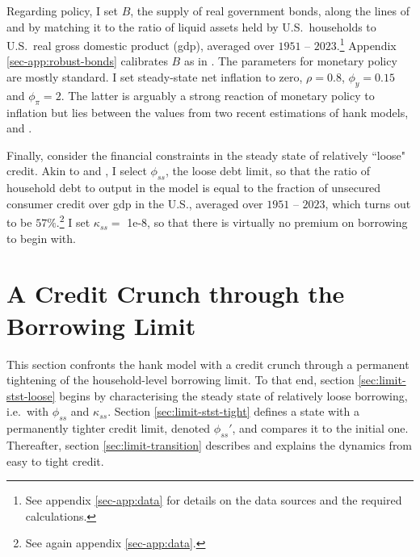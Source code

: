 \documentclass[a4paper,12pt]{article} %
\numberwithin{equation}{section} %
\numberwithin{figure}{section}
\numberwithin{table}{section}
\begin{document}
Regarding policy, I set $B$, the supply of real government bonds, along the lines of \textcite{mckay2016} and \textcite{gl2017} by matching it to the ratio of liquid assets held by U.S.~households to U.S.~real gross domestic product (\Gls{gdp}), averaged over $1951$ -- $2023$.\footnote{See appendix \ref{sec-app:data} for details on the data sources and the required calculations.} Appendix \ref{sec-app:robust-bonds} calibrates $B$ as in \textcite{bayer2023}. The parameters for monetary policy are mostly standard. I set steady-state net inflation to zero, $\rho = 0.8$, $\phi_y = 0.15$ and $\phi_{\pi} = 2$. The latter is arguably a strong reaction of monetary policy to inflation but lies between the values from two recent estimations of \Gls{hank} models, \textcite{boehl2022} and \textcite{bayer2023}.

Finally, consider the financial constraints in the steady state of relatively ``loose" credit. Akin to \textcite{gl2017} and \textcite{bayer2023}, I select $\phi_{ss}$, the loose debt limit, so that the ratio of household debt to output in the model is equal to the fraction of unsecured consumer credit over \Gls{gdp} in the U.S., averaged over $1951$ -- $2023$, which turns out to be $57\%$.\footnote{See again appendix \ref{sec-app:data}.} I set $\kappa_{ss} =$ 1e-8, so that there is virtually no premium on borrowing to begin with.

\section{A Credit Crunch through the Borrowing Limit}
\label{sec:limit}

This section confronts the \Gls{hank} model with a credit crunch through a permanent tightening of the household-level borrowing limit. To that end, section \ref{sec:limit-stst-loose} begins by characterising the steady state of relatively loose borrowing, i.e.~with $\phi_{ss}$ and $\kappa_{ss}$. Section \ref{sec:limit-stst-tight} defines a state with a permanently tighter credit limit, denoted $\phi_{ss}'$, and compares it to the initial one. Thereafter, section \ref{sec:limit-transition} describes and explains the dynamics from easy to tight credit.

\end{document}
